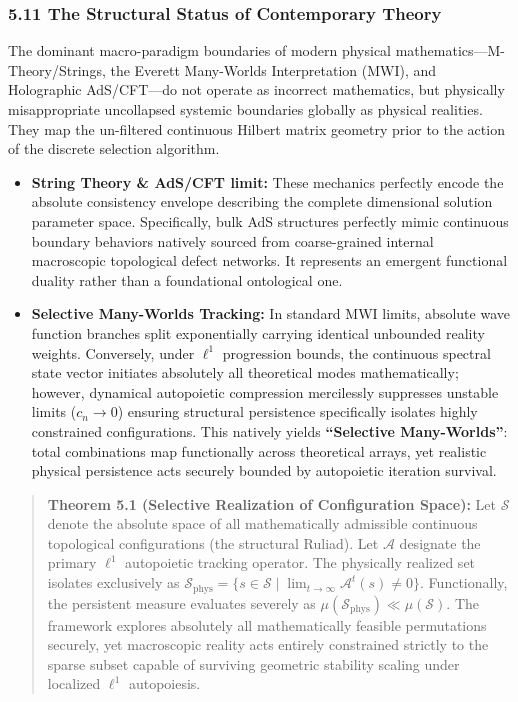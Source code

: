 \documentclass[
]{article}
\providecommand{\tightlist}{%
  \setlength{\itemsep}{0pt}\setlength{\parskip}{0pt}}
\begin{document}
\subsubsection{5.11 The Structural Status of Contemporary
Theory}\label{the-structural-status-of-contemporary-theory}

The dominant macro-paradigm boundaries of modern physical
mathematics---M-Theory/Strings, the Everett Many-Worlds Interpretation
(MWI), and Holographic AdS/CFT---do not operate as incorrect
mathematics, but physically misappropriate uncollapsed systemic
boundaries globally as physical realities. They map the un-filtered
continuous Hilbert matrix geometry prior to the action of the discrete
selection algorithm.

\begin{itemize}
\tightlist
\item
  \textbf{String Theory \& AdS/CFT limit:} These mechanics perfectly
  encode the absolute consistency envelope describing the complete
  dimensional solution parameter space. Specifically, bulk AdS
  structures perfectly mimic continuous boundary behaviors natively
  sourced from coarse-grained internal macroscopic topological defect
  networks. It represents an emergent functional duality rather than a
  foundational ontological one.
\item
  \textbf{Selective Many-Worlds Tracking:} In standard MWI limits,
  absolute wave function branches split exponentially carrying identical
  unbounded reality weights. Conversely, under \(\ell^1\) progression
  bounds, the continuous spectral state vector initiates absolutely all
  theoretical modes mathematically; however, dynamical autopoietic
  compression mercilessly suppresses unstable limits
  (\(c_n \rightarrow 0\)) ensuring structural persistence specifically
  isolates highly constrained configurations. This natively yields
  \textbf{``Selective Many-Worlds''}: total combinations map
  functionally across theoretical arrays, yet realistic physical
  persistence acts securely bounded by autopoietic iteration survival.
\end{itemize}

\begin{quote}
\textbf{Theorem 5.1 (Selective Realization of Configuration Space):} Let
\(\mathcal{S}\) denote the absolute space of all mathematically
admissible continuous topological configurations (the structural
Ruliad). Let \(\mathcal{A}\) designate the primary \(\ell^1\)
autopoietic tracking operator. The physically realized set isolates
exclusively as
\(\mathcal{S}_{\text{phys}} = \{ s \in \mathcal{S} \mid \lim_{t\to\infty} \mathcal{A}^t(s) \neq 0 \}\).
Functionally, the persistent measure evaluates severely as
\(\mu(\mathcal{S}_{\text{phys}}) \ll \mu(\mathcal{S})\). The framework
explores absolutely all mathematically feasible permutations securely,
yet macroscopic reality acts entirely constrained strictly to the sparse
subset capable of surviving geometric stability scaling under localized
\(\ell^1\) autopoiesis.
\end{quote}
\end{document}
